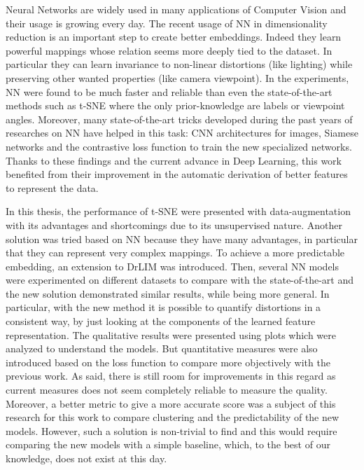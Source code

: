 \documentclass[a4paper,12pt]{report}
\begin{document}
Neural Networks are widely used in many applications of Computer Vision and their usage is growing every day.
The recent usage of NN in dimensionality reduction is an important step to create better embeddings.
Indeed they learn powerful mappings whose relation seems more deeply tied to the dataset.
In particular they can learn invariance to non-linear distortions (like lighting) while preserving other wanted properties (like camera viewpoint).
In the experiments, NN were found to be much faster and reliable than even the state-of-the-art methods such as t-SNE where the only prior-knowledge are labels or viewpoint angles.
Moreover, many state-of-the-art tricks developed during the past years of researches on NN have helped in this task: CNN architectures for images, Siamese networks and the contrastive loss function to train the new specialized networks.
Thanks to these findings and the current advance in Deep Learning, this work benefited from their improvement in the automatic derivation of better features to represent the data.

In this thesis, the performance of t-SNE were presented with data-augmentation with its advantages and shortcomings due to its unsupervised nature.
Another solution was tried based on NN because they have many advantages, in particular that they can represent very complex mappings.
To achieve a more predictable embedding, an extension to DrLIM was introduced.
Then, several NN models were experimented on different datasets to compare with the state-of-the-art and the new solution demonstrated similar results, while being more general.
In particular, with the new method it is possible to quantify distortions in a consistent way, by just looking at the components of the learned feature representation.
The qualitative results were presented using plots which were analyzed to understand the models.
But quantitative measures were also introduced based on the loss function to compare more objectively with the previous work.
As said, there is still room for improvements in this regard as current measures does not seem completely reliable to measure the quality.
Moreover, a better metric to give a more accurate score was a subject of this research for this work to compare clustering and the predictability of the new models.
However, such a solution is non-trivial to find and this would require comparing the new models with a simple baseline, which, to the best of our knowledge, does not exist at this day.
\end{document}
